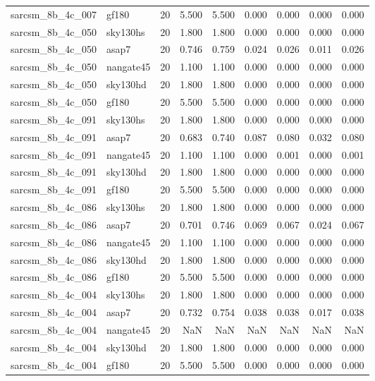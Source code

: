 \begin{tabular}{llrrrrrrr}
sarcsm\_8b\_4c\_007 & gf180 & 20 & 5.500 & 5.500 & 0.000 & 0.000 & 0.000 & 0.000 \\
sarcsm\_8b\_4c\_050 & sky130hs & 20 & 1.800 & 1.800 & 0.000 & 0.000 & 0.000 & 0.000 \\
sarcsm\_8b\_4c\_050 & asap7 & 20 & 0.746 & 0.759 & 0.024 & 0.026 & 0.011 & 0.026 \\
sarcsm\_8b\_4c\_050 & nangate45 & 20 & 1.100 & 1.100 & 0.000 & 0.000 & 0.000 & 0.000 \\
sarcsm\_8b\_4c\_050 & sky130hd & 20 & 1.800 & 1.800 & 0.000 & 0.000 & 0.000 & 0.000 \\
sarcsm\_8b\_4c\_050 & gf180 & 20 & 5.500 & 5.500 & 0.000 & 0.000 & 0.000 & 0.000 \\
sarcsm\_8b\_4c\_091 & sky130hs & 20 & 1.800 & 1.800 & 0.000 & 0.000 & 0.000 & 0.000 \\
sarcsm\_8b\_4c\_091 & asap7 & 20 & 0.683 & 0.740 & 0.087 & 0.080 & 0.032 & 0.080 \\
sarcsm\_8b\_4c\_091 & nangate45 & 20 & 1.100 & 1.100 & 0.000 & 0.001 & 0.000 & 0.001 \\
sarcsm\_8b\_4c\_091 & sky130hd & 20 & 1.800 & 1.800 & 0.000 & 0.000 & 0.000 & 0.000 \\
sarcsm\_8b\_4c\_091 & gf180 & 20 & 5.500 & 5.500 & 0.000 & 0.000 & 0.000 & 0.000 \\
sarcsm\_8b\_4c\_086 & sky130hs & 20 & 1.800 & 1.800 & 0.000 & 0.000 & 0.000 & 0.000 \\
sarcsm\_8b\_4c\_086 & asap7 & 20 & 0.701 & 0.746 & 0.069 & 0.067 & 0.024 & 0.067 \\
sarcsm\_8b\_4c\_086 & nangate45 & 20 & 1.100 & 1.100 & 0.000 & 0.000 & 0.000 & 0.000 \\
sarcsm\_8b\_4c\_086 & sky130hd & 20 & 1.800 & 1.800 & 0.000 & 0.000 & 0.000 & 0.000 \\
sarcsm\_8b\_4c\_086 & gf180 & 20 & 5.500 & 5.500 & 0.000 & 0.000 & 0.000 & 0.000 \\
sarcsm\_8b\_4c\_004 & sky130hs & 20 & 1.800 & 1.800 & 0.000 & 0.000 & 0.000 & 0.000 \\
sarcsm\_8b\_4c\_004 & asap7 & 20 & 0.732 & 0.754 & 0.038 & 0.038 & 0.017 & 0.038 \\
sarcsm\_8b\_4c\_004 & nangate45 & 20 & NaN & NaN & NaN & NaN & NaN & NaN \\
sarcsm\_8b\_4c\_004 & sky130hd & 20 & 1.800 & 1.800 & 0.000 & 0.000 & 0.000 & 0.000 \\
sarcsm\_8b\_4c\_004 & gf180 & 20 & 5.500 & 5.500 & 0.000 & 0.000 & 0.000 & 0.000 \\

\end{tabular}
